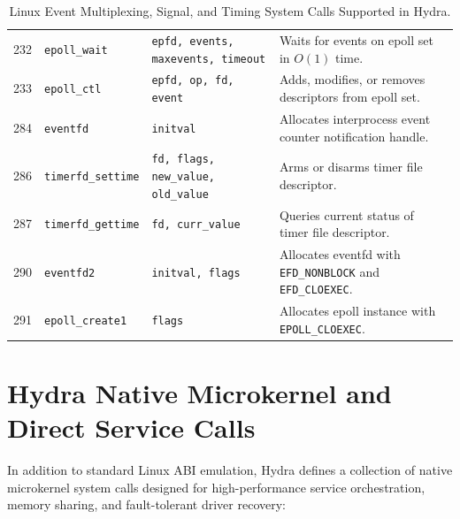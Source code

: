 \begin{table}[htbp]
\begin{tabularx}{\textwidth}{rllX}
232 & \texttt{epoll\_wait} & \texttt{epfd, events, maxevents, timeout} & Waits for events on epoll set in $O(1)$ time. \\
233 & \texttt{epoll\_ctl} & \texttt{epfd, op, fd, event} & Adds, modifies, or removes descriptors from epoll set. \\
284 & \texttt{eventfd} & \texttt{initval} & Allocates interprocess event counter notification handle. \\
286 & \texttt{timerfd\_settime} & \texttt{fd, flags, new\_value, old\_value} & Arms or disarms timer file descriptor. \\
287 & \texttt{timerfd\_gettime} & \texttt{fd, curr\_value} & Queries current status of timer file descriptor. \\
290 & \texttt{eventfd2} & \texttt{initval, flags} & Allocates eventfd with \texttt{EFD\_NONBLOCK} and \texttt{EFD\_CLOEXEC}. \\
291 & \texttt{epoll\_create1} & \texttt{flags} & Allocates epoll instance with \texttt{EPOLL\_CLOEXEC}. \\
\bottomrule
\end{tabularx}
\caption{Linux Event Multiplexing, Signal, and Timing System Calls Supported in Hydra.}
\label{tab:syscall_event}
\end{table}

\section{Hydra Native Microkernel and Direct Service Calls}
\label{sec:ref_native_syscalls}

In addition to standard Linux ABI emulation, Hydra defines a collection of native microkernel system calls designed for high-performance service orchestration, memory sharing, and fault-tolerant driver recovery:

